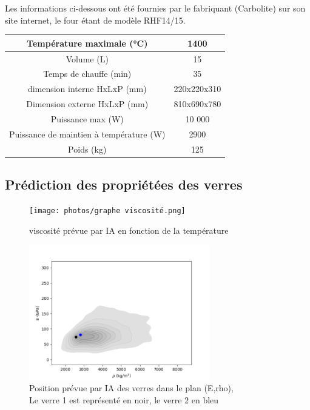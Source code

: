 \documentclass{article}
\begin{document}
Les informations ci-dessous ont été fournies par le fabriquant (Carbolite) sur son site internet, le four étant de modèle RHF14/15.

\begin{table}[h!]
    \centering
\begin{tabular}{|c|c|}
\hline
Température maximale (°C) & 1400  \\
\hline
Volume (L) & 15 \\
\hline
Temps de chauffe (min) & 35 \\
\hline
dimension interne HxLxP (mm) & 220x220x310 \\
\hline
Dimension externe HxLxP (mm) & 810x690x780 \\
\hline
Puissance max (W) & 10 000 \\
\hline
Puissance de maintien à température (W) & 2900 \\
\hline
Poids (kg) & 125 \\
\hline
\end{tabular} 
\end{table}



\subsection{Prédiction des propriétées des verres}
\begin{figure}[ht]
    \centering
    \texttt{[image: photos/graphe viscosité.png]}
    \caption{viscosité prévue par IA en fonction de la température}
\end{figure}

\begin{figure}[ht]
    \centering
    \includegraphics[width=0.7\textwidth]{photos/E rho.png}
    \caption{Position prévue par IA des verres dans le plan (E,rho),\\ Le verre 1 est représenté en noir, le verre 2 en bleu}
\end{figure}
\end{document}
